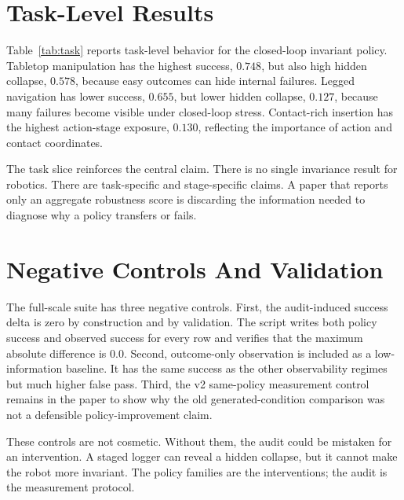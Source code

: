 \documentclass{article}
\begin{document}
\section{Task-Level Results}

\begin{table}[t]
\centering
\small
\resizebox{\linewidth}{!}{}
\caption{Task summary for the closed-loop invariant policy. Task differences affect hidden collapse and action-stage exposure even under the best non-oracle policy.}
\label{tab:task}
\end{table}

Table~\ref{tab:task} reports task-level behavior for the closed-loop invariant policy. Tabletop manipulation has the highest success, $0.748$, but also high hidden collapse, $0.578$, because easy outcomes can hide internal failures. Legged navigation has lower success, $0.655$, but lower hidden collapse, $0.127$, because many failures become visible under closed-loop stress. Contact-rich insertion has the highest action-stage exposure, $0.130$, reflecting the importance of action and contact coordinates.

The task slice reinforces the central claim. There is no single invariance result for robotics. There are task-specific and stage-specific claims. A paper that reports only an aggregate robustness score is discarding the information needed to diagnose why a policy transfers or fails.

\section{Negative Controls And Validation}

The full-scale suite has three negative controls. First, the audit-induced success delta is zero by construction and by validation. The script writes both policy success and observed success for every row and verifies that the maximum absolute difference is $0.0$. Second, outcome-only observation is included as a low-information baseline. It has the same success as the other observability regimes but much higher false pass. Third, the v2 same-policy measurement control remains in the paper to show why the old generated-condition comparison was not a defensible policy-improvement claim.

These controls are not cosmetic. Without them, the audit could be mistaken for an intervention. A staged logger can reveal a hidden collapse, but it cannot make the robot more invariant. The policy families are the interventions; the audit is the measurement protocol.
\end{document}
